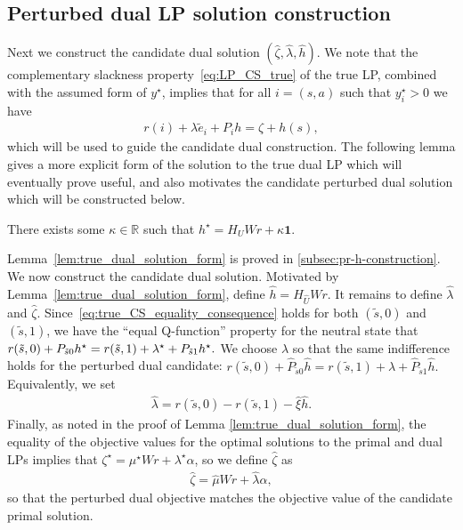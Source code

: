 \documentclass[mnsc,nonblindrev]{informs3}
\newcommand{\R}{\mathbb{R}}
\newcommand{\Phat}{\widehat{P}}
\newcommand{\one}{\mathbf{1}}
\newcommand{\hhat}{\widehat{h}}
\newcommand{\muhat}{\widehat{\mu}}
\newcommand{\uhat}{\widehat{U}}
\newcommand{\xihat}{\widehat{\xi}}
\newcommand{\zetahat}{\widehat{\zeta}}
\newcommand{\lambdahat}{\widehat{\lambda}}
\begin{document}
\subsection{Perturbed dual LP solution construction}
\label{sec:pert_subsec_3}

Next we construct the candidate dual solution $(\zetahat, \lambdahat, \hhat)$. We note that the complementary slackness property~\eqref{eq:LP_CS_true} of the true LP, combined with the assumed form of $y^\star$, implies that for all $i=(s,a)$ such that $y_i^\star > 0$ we have
\begin{align}
    r(i) + \lambda \tilde{e}_i + P_{i}h = \zeta + h(s), \label{eq:true_CS_equality_consequence}
\end{align}
which will be used to guide the candidate dual construction. The following lemma gives a more explicit form of the solution to the true dual LP which will eventually prove useful, and also motivates the candidate perturbed dual solution which will be constructed below.
\begin{lemma}
\label{lem:true_dual_solution_form}
    There exists some $\kappa \in \R$ such that
    $
        h^\star = H_U Wr + \kappa \one.
    $
\end{lemma}
Lemma~\ref{lem:true_dual_solution_form} is proved in \ref{subsec:pr-h-construction}. We now construct the candidate dual solution. Motivated by
Lemma~\ref{lem:true_dual_solution_form}, define
\(
    \hhat = H_{\uhat}Wr.
\)
It remains to define \(\lambdahat\) and \(\zetahat\). Since~\eqref{eq:true_CS_equality_consequence} holds for both $(\tilde{s}, 0)$ and $(\tilde{s}, 1)$, we have the ``equal Q-function'' property for the neutral state that
$
    r(\tilde{s},0) + P_{\Tilde{s}0} h^\star = r(\tilde{s},1) + \lambda^\star + P_{\Tilde{s}1} h^\star.
$
We choose \(\lambdahat\) so that the same indifference holds for the
perturbed dual candidate:
\(
    r(\tilde{s},0)+\Phat_{\tilde{s}0}\hhat
    =
    r(\tilde{s},1)+\lambdahat+\Phat_{\tilde{s}1}\hhat .
\)
Equivalently, we set
\begin{align}
    \lambdahat
    =
    r(\tilde{s},0)-r(\tilde{s},1)-\xihat\hhat .
    \label{eq:lambdahat_defn}
\end{align}
Finally, as noted in the proof of Lemma \ref{lem:true_dual_solution_form}, the equality of the objective values for the optimal solutions to the primal and dual LPs implies that $\zeta^\star = \mu^\star Wr + \lambda^\star \alpha$, so we define $\zetahat$ as
\begin{align}
    \zetahat = \muhat W r  + \lambdahat \alpha,   
    \label{eq:zetahat_defn} 
\end{align}
so that the perturbed dual objective matches the objective value of the
candidate primal solution.
\end{document}
